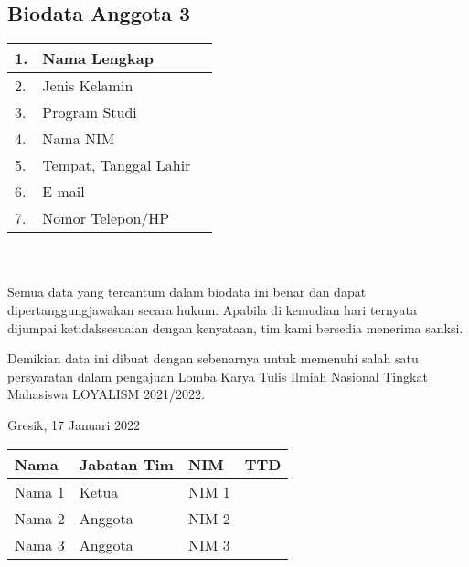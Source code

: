 \subsection{Biodata Anggota 3}
\renewcommand{\arraystretch}{1.5}
\quad \begin{tabular}{@{}|m{}|m{}|m{}|}
\hline
1. & Nama Lengkap &  \\
\hline
2. & Jenis Kelamin &  \\
\hline
3. & Program Studi &  \\
\hline
4. & Nama NIM & \\
\hline
5. & Tempat, Tanggal Lahir & \\
\hline
6. & E-mail &  \\
\hline
7. & Nomor Telepon/HP &  \\
\hline
\end{tabular}
\\
\vspace*{.2cm}
\\
\indent Semua data yang tercantum dalam biodata ini benar dan dapat
dipertanggungjawakan secara hukum. Apabila di kemudian hari ternyata dijumpai ketidaksesuaian dengan kenyataan, tim kami bersedia menerima sanksi.

\vspace*{.2cm}

Demikian data ini dibuat dengan sebenarnya untuk memenuhi salah satu
persyaratan dalam pengajuan Lomba Karya Tulis Ilmiah Nasional Tingkat Mahasiswa LOYALISM 2021/2022.

\begin{flushright}
    Gresik, 17 Januari 2022
\end{flushright}
\renewcommand{\arraystretch}{3}
\begin{tabular}{|K{.246\textwidth}|K{.2\textwidth}|K{.223\textwidth}|K{.223\textwidth}|}
    \hline
    Nama & Jabatan Tim & NIM & TTD  \\
    \hline
     Nama 1 & Ketua & NIM 1 &\\
     \hline
     Nama 2 & Anggota & NIM 2 &\\
     \hline
     Nama 3 & Anggota & NIM 3 & \\
     \hline
\end{tabular}
